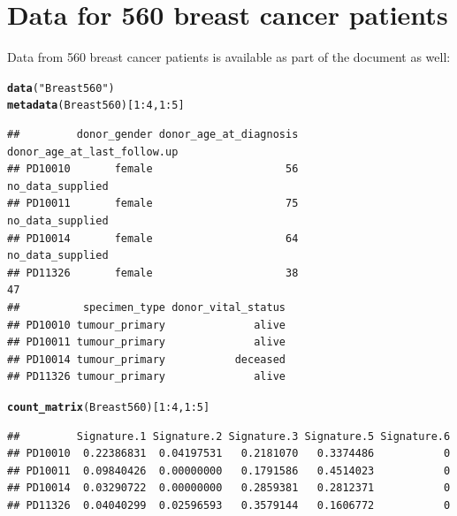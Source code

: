 \documentclass{article}\usepackage[]{graphicx}\usepackage[]{color}
\makeatletter
\newcommand{\hlnum}[1]{\textcolor[rgb]{0.686,0.059,0.569}{#1}}%
\newcommand{\hlstr}[1]{\textcolor[rgb]{0.192,0.494,0.8}{#1}}%
\newcommand{\hlopt}[1]{\textcolor[rgb]{0,0,0}{#1}}%
\newcommand{\hlstd}[1]{\textcolor[rgb]{0.345,0.345,0.345}{#1}}%
\newcommand{\hlkwd}[1]{\textcolor[rgb]{0.737,0.353,0.396}{\textbf{#1}}}%
\newenvironment{kframe}{%
 \def\at@end@of@kframe{}%
 \ifinner\ifhmode%
  \def\at@end@of@kframe{\end{minipage}}%
  \begin{minipage}{\columnwidth}%
 \fi\fi%
 \def\FrameCommand##1{\hskip\@totalleftmargin \hskip-\fboxsep
 \colorbox{shadecolor}{##1}\hskip-\fboxsep
     \hskip-\linewidth \hskip-\@totalleftmargin \hskip\columnwidth}%
 \MakeFramed {\advance\hsize-\width
   \@totalleftmargin\z@ \linewidth\hsize
   \@setminipage}}%
 {\par\unskip\endMakeFramed%
 \at@end@of@kframe}
\newenvironment{knitrout}{}{} %
\makeatother
\begin{document}
\section{Data for 560 breast cancer patients}
Data from 560 breast cancer patients is available as part of the document as well:

\begin{knitrout}
\color{fgcolor}\begin{kframe}
\begin{alltt}
\hlkwd{data}\hlstd{(}\hlstr{"Breast560"}\hlstd{)}
\hlkwd{metadata}\hlstd{(Breast560)[}\hlnum{1}\hlopt{:}\hlnum{4}\hlstd{,}\hlnum{1}\hlopt{:}\hlnum{5}\hlstd{]}
\end{alltt}
\begin{verbatim}
##         donor_gender donor_age_at_diagnosis donor_age_at_last_follow.up
## PD10010       female                     56            no_data_supplied
## PD10011       female                     75            no_data_supplied
## PD10014       female                     64            no_data_supplied
## PD11326       female                     38                          47
##          specimen_type donor_vital_status
## PD10010 tumour_primary              alive
## PD10011 tumour_primary              alive
## PD10014 tumour_primary           deceased
## PD11326 tumour_primary              alive
\end{verbatim}
\begin{alltt}
\hlkwd{count_matrix}\hlstd{(Breast560)[}\hlnum{1}\hlopt{:}\hlnum{4}\hlstd{,}\hlnum{1}\hlopt{:}\hlnum{5}\hlstd{]}
\end{alltt}
\begin{verbatim}
##         Signature.1 Signature.2 Signature.3 Signature.5 Signature.6
## PD10010  0.22386831  0.04197531   0.2181070   0.3374486           0
## PD10011  0.09840426  0.00000000   0.1791586   0.4514023           0
## PD10014  0.03290722  0.00000000   0.2859381   0.2812371           0
## PD11326  0.04040299  0.02596593   0.3579144   0.1606772           0
\end{verbatim}
\end{kframe}
\end{knitrout}
\end{document}
